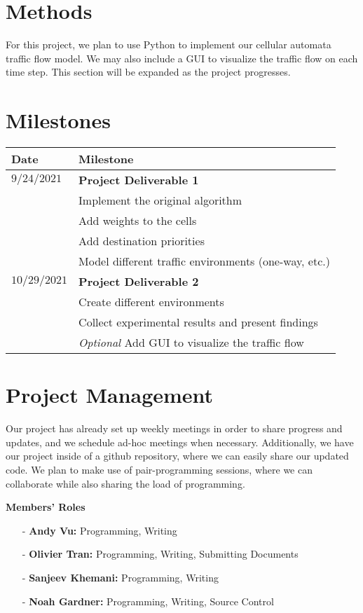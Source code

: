 \documentclass[sigplan,screen]{acmart}
\begin{document}
\section{Methods}
For this project, we plan to use Python to implement our cellular automata
traffic flow model. We may also include a GUI to visualize the traffic flow on
each time step. This section will be expanded as the project progresses.

\section{Milestones}
\begin{tabular}{|l|l|}
    \hline
    \textbf{Date} & \textbf{Milestone}                                      \\
    \hline
    $9/24/2021$   & \textbf{Project Deliverable 1}                          \\
    \hline
                  & Implement the original algorithm                        \\
    \hline
                  & Add weights to the cells                                \\
    \hline
                  & Add destination priorities                              \\
    \hline
                  & Model different traffic environments (one-way, etc.)    \\
    \hline
    $10/29/2021$  & \textbf{Project Deliverable 2}                          \\
    \hline
                  & Create different environments                           \\
    \hline
                  & Collect experimental results and present findings       \\
    \hline
                  & \textit{Optional} Add GUI to visualize the traffic flow \\
    \hline
\end{tabular}


\section{Project Management}
Our project has already set up weekly meetings in order to share progress and
updates, and we schedule ad-hoc meetings when necessary. Additionally, we have
our project inside of a github repository, where we can easily share our updated
code. We plan to make use of pair-programming sessions, where we can collaborate
while also sharing the load of programming.

\textbf{Members' Roles}
\begin{itemize}

    \item[-] \textbf{Andy Vu:} Programming, Writing
    \item[-] \textbf{Olivier Tran:} Programming, Writing, Submitting Documents
    \item[-] \textbf{Sanjeev Khemani:} Programming, Writing
    \item[-] \textbf{Noah Gardner:} Programming, Writing, Source Control
\end{itemize}



\end{document}

